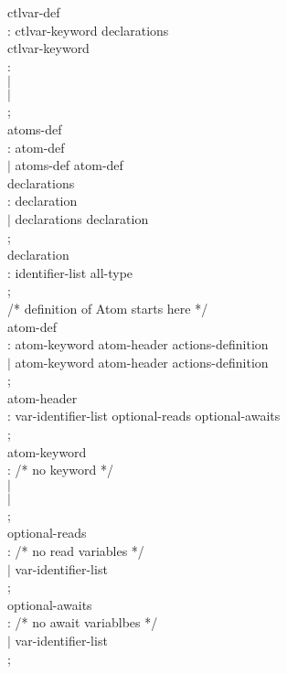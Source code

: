 \begin{tab}
\begin{tabbing}
ctlvar-def \\
\>: ctlvar-keyword  declarations \\

ctlvar-keyword \\
\>: \PRIVATE \\
\>$|$ \INTERFACE \\
\>$|$ \EXTERNAL \\
\>; \\

atoms-def \\
\>: atom-def \\
\>$|$ atoms-def atom-def \\

declarations \\
\>: declaration \\
\>$|$ declarations \SEMICOLON declaration \\
\>; \\

declaration \\
\>: identifier-list \COLON all-type \\
\>; \\

/* definition of Atom starts here */ \\

atom-def \\
\>: atom-keyword \TTATOM atom-header actions-definition \ENDATOM \\
\>$|$ atom-keyword \TTATOM \ATOMID atom-header actions-definition
\ENDATOM \\
\>; \\

atom-header \\
\>: \TTCONTROLS var-identifier-list optional-reads optional-awaits \\
\>; \\

atom-keyword \\
\>: /* no keyword */  \\
\>$|$ \TTLAZY \\
\>$|$ \EVENT \\
\>; \\

optional-reads \\
\>: /* no read variables */ \\
\>$|$ \TTREADS var-identifier-list \\
\>; \\

optional-awaits \\
\>: /* no await variablbes */ \\
\>$|$ \TTAWAITS var-identifier-list \\
\>; \\


\end{tabbing}
\end{tab}
